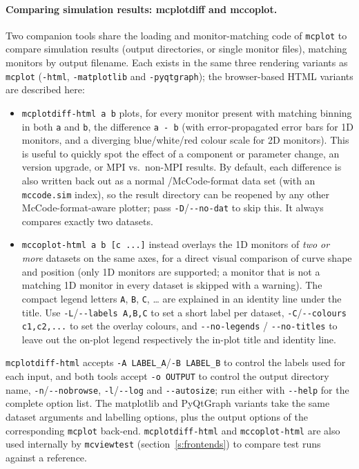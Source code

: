 \paragraph{Comparing simulation results: mcplotdiff and mccoplot.}
Two companion tools share the loading and monitor-matching code of
\texttt{mcplot} to compare simulation results (output directories, or single
monitor files), matching monitors by output filename. Each exists in the same
three rendering variants as \texttt{mcplot} (\texttt{-html},
\texttt{-matplotlib} and \texttt{-pyqtgraph}); the browser-based HTML variants
are described here:
\begin{itemize}
\item \verb+mcplotdiff-html a b+ plots, for every monitor present with
  matching binning in both \texttt{a} and \texttt{b}, the difference
  \texttt{a - b} (with error-propagated error bars for 1D monitors, and a
  diverging blue/white/red colour scale for 2D monitors). This is useful to
  quickly spot the effect of a component or parameter change, an \MCS version
  upgrade, or MPI vs.\ non-MPI results. By default, each difference is also
  written back out as a normal \MCS/McCode-format data set (with an
  \texttt{mccode.sim} index), so the result directory can be reopened by any
  other McCode-format-aware plotter; pass \verb+-D+/\verb+--no-dat+ to skip this.
It always compares exactly two datasets.
\item \verb+mccoplot-html a b [c ...]+ instead overlays the 1D monitors of
  \emph{two or more} datasets on the same axes, for a direct visual comparison
  of curve shape and position (only 1D monitors are supported; a monitor that
  is not a matching 1D monitor in every dataset is skipped with a warning).
  The compact legend letters \texttt{A}, \texttt{B}, \texttt{C}, \ldots{} are
  explained in an identity line under the title. Use
  \verb+-L+/\verb+--labels A,B,C+ to set a short label per dataset,
  \verb+-C+/\verb+--colours c1,c2,...+ to set the overlay colours, and
  \verb+--no-legends+ / \verb+--no-titles+ to leave out the on-plot legend
  respectively the in-plot title and identity line.
\end{itemize}
\texttt{mcplotdiff-html} accepts \verb+-A LABEL_A+/\verb+-B LABEL_B+ to control
the labels used for each input, and both tools accept \verb+-o OUTPUT+ to
control the output directory name, \verb+-n+/\verb+--nobrowse+, \verb+-l+/\verb+--log+
and \verb+--autosize+; run either with \verb+--help+ for the complete option
list. The matplotlib and PyQtGraph variants take the same dataset arguments and
labelling options, plus the output options of the corresponding \texttt{mcplot}
back-end. \texttt{mcplotdiff-html} and \texttt{mccoplot-html} are also used
internally by \texttt{mcviewtest} (section~\ref{s:frontends}) to compare test
runs against a reference.



